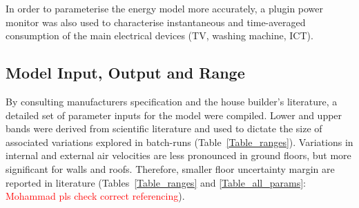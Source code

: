 \documentclass[preprint,12pt, sort&compress]{elsarticle}
\newcommand{\red}[1]{\textcolor{red}{#1}}
\begin{document}
In order to parameterise the energy model more accurately, a plugin power monitor was also used to characterise instantaneous and time-averaged consumption of the main electrical devices (TV, washing machine, ICT).


\subsection{Model Input, Output and Range}\label{Subsec_InputsOutputs}

By consulting manufacturers specification and the house builder’s literature, a detailed set of parameter inputs for the model were compiled. Lower and upper bands were derived from scientific literature and used to dictate the size of associated variations explored in batch-runs (Table~\ref{Table_ranges}).  Variations in internal and external air velocities are less pronounced in ground floors, but more significant for walls and roofs. Therefore, smaller floor uncertainty margin are reported in literature (Tables~\ref{Table_ranges} and \ref{Table_all_params}: \red{Mohammad pls check correct referencing}). 
\end{document}
